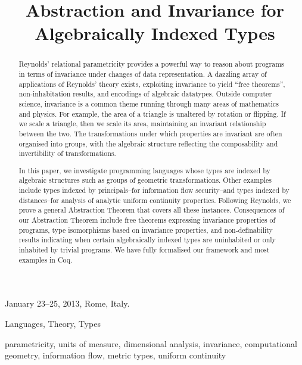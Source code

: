 \documentclass{sigplanconf}
\title{Abstraction and Invariance for Algebraically Indexed Types}
\theoremstyle{examplestyle}
\theoremstyle{restatementstyle}
\begin{document}
 {January 23--25, 2013, Rome, Italy.}

\maketitle

\begin{abstract}
  Reynolds' relational parametricity provides a powerful way to reason
  about programs in terms of invariance under changes of data
  representation. A dazzling array of applications of Reynolds' theory
  exists, exploiting invariance to yield ``free theorems'',
  non-inhabitation results, and encodings of algebraic datatypes.
  Outside computer science, invariance is a common theme running
  through many areas of mathematics and physics. For example, the area of
  a triangle is unaltered by rotation or flipping. If we scale a
  triangle, then we scale its area, maintaining an invariant
  relationship between the two. The transformations under which
  properties are invariant are often organised into groups, with the
  algebraic structure reflecting the composability and invertibility
  of transformations.

  In this paper, we investigate programming languages whose types are
  indexed by algebraic structures such as groups of geometric
  transformations. Other examples include types indexed by
  principals--for information flow security--and types indexed by
  distances--for analysis of analytic uniform continuity
  properties. Following Reynolds, we prove a general Abstraction
  Theorem that covers all these instances. Consequences of our
  Abstraction Theorem include free theorems expressing invariance
  properties of programs, type isomorphisms based on invariance
  properties, and non-definability results indicating when certain
  algebraically indexed types are uninhabited or only inhabited by
  trivial programs.  We have fully formalised our framework and most
  examples in Coq.
\end{abstract}

  

\terms
  Languages, Theory, Types

\keywords parametricity, units of measure, dimensional analysis,
invariance, computational geometry, information flow, metric types, uniform continuity
\end{document}
